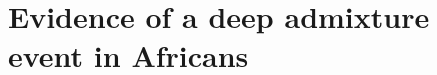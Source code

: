 \clearpage






\section{Evidence of a deep admixture event in Africans}
\label{sec:ch3-gb-deep}


